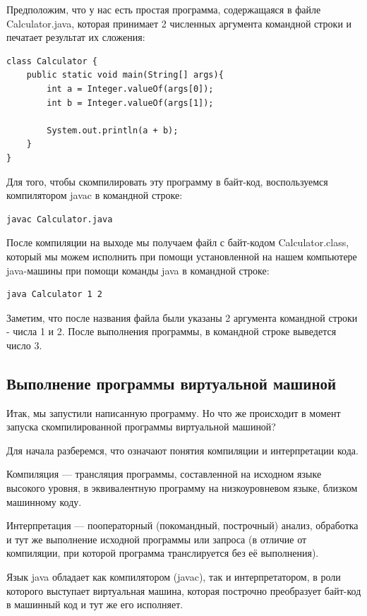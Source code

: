 \documentclass[]{scrartcl}
\begin{document}
Предположим, что у нас есть простая программа, содержащаяся в файле Calculator.java, которая принимает 2 численных аргумента командной строки и печатает результат их сложения:

\begin{lstlisting}
class Calculator {
	public static void main(String[] args){
		int a = Integer.valueOf(args[0]);
		int b = Integer.valueOf(args[1]);

		System.out.println(a + b);
	}
}
\end{lstlisting}

Для того, чтобы скомпилировать эту программу в байт-код, воспользуемся компилятором javac в командной строке:

\begin{lstlisting}
javac Calculator.java
\end{lstlisting}

После компиляции на выходе мы получаем файл с байт-кодом Calculator.class, который мы можем исполнить при помощи установленной на нашем компьютере java-машины при помощи команды java в командной строке:

\begin{lstlisting}
java Calculator 1 2
\end{lstlisting}

Заметим, что после названия файла были указаны 2 аргумента командной строки - числа 1 и 2. После выполнения программы, в командной строке выведется число 3.

\subsection{Выполнение программы виртуальной машиной}

Итак, мы запустили написанную программу. Но что же происходит в момент запуска скомпилированной программы виртуальной машиной?

Для начала разберемся, что означают понятия компиляции и интерпретации кода.

Компиляция — трансляция программы, составленной на исходном языке высокого уровня, в эквивалентную программу на низкоуровневом языке, близком машинному коду. 

Интерпретация — пооператорный (покомандный, построчный) анализ, обработка и тут же выполнение исходной программы или запроса (в отличие от компиляции, при которой программа транслируется без её выполнения).

Язык java обладает как компилятором (javac), так и интерпретатором, в роли которого выступает виртуальная машина, которая построчно преобразует байт-код в машинный код и тут же его исполняет. 
\end{document}
